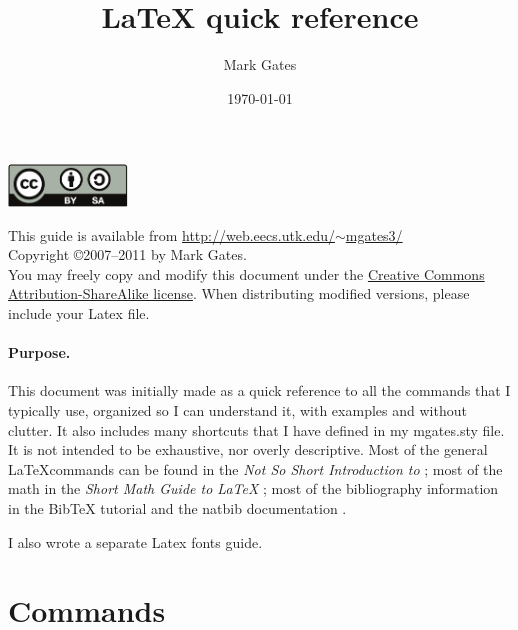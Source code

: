 \documentclass[12pt]{article}
\begin{document}
\title{\LaTeX{} quick reference}
\author{Mark Gates}
\date{\today}
\maketitle

\noindent
\begin{minipage}{1.3in}
\href{http://creativecommons.org/licenses/by-sa/2.0/}{\includegraphics[width=1.25in]{cc/by-sa.pdf}}
\end{minipage}
\begin{minipage}{5in}
This guide is available from
\href{http://web.eecs.utk.edu/~mgates3/}{http://web.eecs.utk.edu/${\sim}$mgates3/}
\\
Copyright \copyright 2007--2011 by Mark Gates.
\\
You may freely copy and modify this document under the
\href{http://creativecommons.org/licenses/by-sa/2.0/}{Creative Commons Attribution-ShareAlike license}.
When distributing modified versions, please include your Latex file.
\end{minipage}


\paragraph{Purpose.}

This document was initially made as a quick reference to all the
commands that I typically use, organized so I can understand it, with
examples and without clutter. It also includes many shortcuts that I
have defined in my mgates.sty file. It is not intended to be exhaustive,
nor overly descriptive. Most of the general \LaTeX commands can be found
in the \emph{Not So Short Introduction to \LaTeXe} \cite{NotSoShort};
most of the math in the \emph{Short Math Guide to \LaTeX}
\cite{AMSShortGuide}; most of the bibliography information in the BibTeX
tutorial \cite{Markey05} and the natbib documentation \cite{Daly06}.

I also wrote a separate Latex fonts guide.


\newpage
\setcounter{tocdepth}{2}
\tableofcontents

\setlength{\parindent}{0em}
\setlength{\parskip}{1em}


\newpage
\section{Commands}
\end{document}

